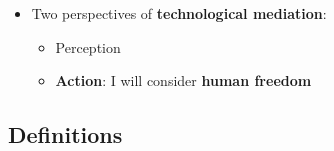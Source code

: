 \documentclass{beamer}
\begin{document}
\begin{frame}[fragile]
\begin{itemize}
	\item Two perspectives of \textbf{technological mediation}:
	\begin{itemize}
		\item Perception
		\item \textbf{Action}: I will consider \textbf{human freedom}
	\end{itemize}
\end{itemize}

\end{frame}

\subsection{Definitions}
\end{document}
